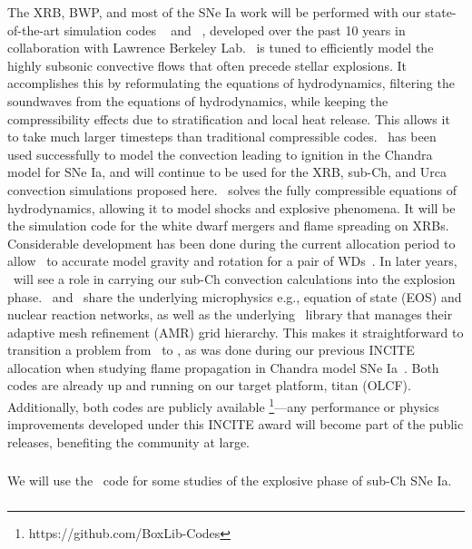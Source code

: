 \documentclass[11pt,letterpaper,english]{article}
\begin{document}
The XRB, BWP, and most of the SNe Ia work will be performed with our
state-of-the-art simulation codes \maestro~\cite{multilevel} and
\castro~\cite{castro:I}, developed over the past 10 years in
collaboration with Lawrence Berkeley Lab.  \maestro\ is tuned to
efficiently model the highly subsonic convective flows that often
precede stellar explosions.  It accomplishes this by reformulating the
equations of hydrodynamics, filtering the soundwaves from the
equations of hydrodynamics, while keeping the compressibility effects
due to stratification and local heat release.  This allows it to take
much larger timesteps than traditional compressible codes.
\maestro\ has been used successfully to model the convection leading
to ignition in the Chandra model for SNe Ia, and will continue to be
used for the XRB, sub-Ch, and Urca convection simulations proposed
here.  \castro\ solves the fully compressible equations of
hydrodynamics, allowing it to model shocks and explosive phenomena.
It will be the simulation code for the white dwarf mergers and flame
spreading on XRBs.  Considerable development has been done during the
current allocation period to allow \castro\ to accurate model gravity
and rotation for a pair of WDs~\cite{katz:2016}.  In later years, \castro\
will see a role in carrying our sub-Ch convection calculations into
the explosion phase.  \maestro\ and \castro\ share the underlying
microphysics e.g., equation of state (EOS) and nuclear reaction
networks, as well as the underlying \boxlib\ library that manages
their adaptive mesh refinement (AMR) grid hierarchy.  This makes it
straightforward to transition a problem from \maestro\ to \castro, as
was done during our previous INCITE allocation when studying flame
propagation in Chandra model SNe Ia~\cite{Mal14}.  Both codes are
already up and running on our target platform, titan (OLCF).
Additionally, both codes are publicly available%
\footnote{https://github.com/BoxLib-Codes}---any performance or
physics improvements developed under this INCITE award will become
part of the public releases, benefiting the community at large.

\subsubsection{\flash}

We will use the \flash\ code for some studies of the explosive phase
of sub-Ch SNe Ia.  \MarginPar{Tom edit}

\subsubsection{\chimera}
\end{document}
